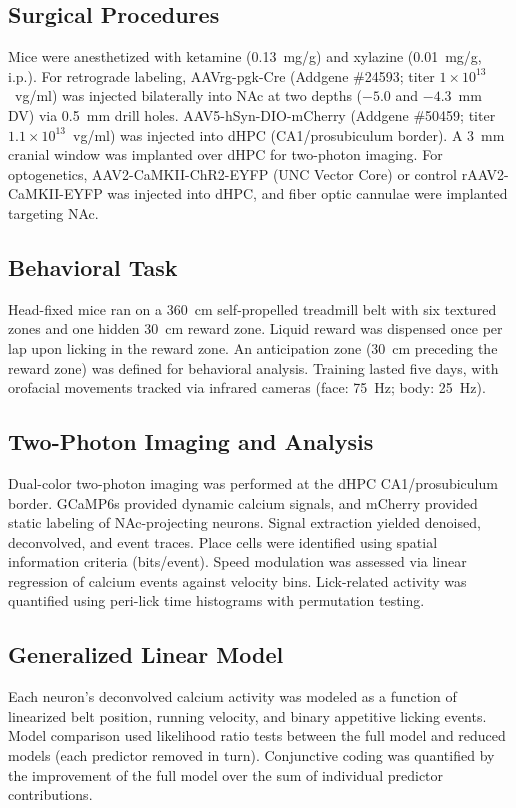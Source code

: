 \documentclass[11pt]{article}
\begin{document}
\subsection{Surgical Procedures}
Mice were anesthetized with ketamine (0.13~mg/g) and xylazine (0.01~mg/g, i.p.). For retrograde labeling, AAVrg-pgk-Cre (Addgene \#24593; titer $1 \times 10^{13}$~vg/ml) was injected bilaterally into NAc at two depths ($-5.0$ and $-4.3$~mm DV) via 0.5~mm drill holes. AAV5-hSyn-DIO-mCherry (Addgene \#50459; titer $1.1 \times 10^{13}$~vg/ml) was injected into dHPC (CA1/prosubiculum border). A 3~mm cranial window was implanted over dHPC for two-photon imaging. For optogenetics, AAV2-CaMKII-ChR2-EYFP (UNC Vector Core) or control rAAV2-CaMKII-EYFP was injected into dHPC, and fiber optic cannulae were implanted targeting NAc.

\subsection{Behavioral Task}
Head-fixed mice ran on a 360~cm self-propelled treadmill belt with six textured zones and one hidden 30~cm reward zone. Liquid reward was dispensed once per lap upon licking in the reward zone. An anticipation zone (30~cm preceding the reward zone) was defined for behavioral analysis. Training lasted five days, with orofacial movements tracked via infrared cameras (face: 75~Hz; body: 25~Hz).

\subsection{Two-Photon Imaging and Analysis}
Dual-color two-photon imaging was performed at the dHPC CA1/prosubiculum border. GCaMP6s provided dynamic calcium signals, and mCherry provided static labeling of NAc-projecting neurons. Signal extraction yielded denoised, deconvolved, and event traces. Place cells were identified using spatial information criteria (bits/event). Speed modulation was assessed via linear regression of calcium events against velocity bins. Lick-related activity was quantified using peri-lick time histograms with permutation testing.

\subsection{Generalized Linear Model}
Each neuron's deconvolved calcium activity was modeled as a function of linearized belt position, running velocity, and binary appetitive licking events. Model comparison used likelihood ratio tests between the full model and reduced models (each predictor removed in turn). Conjunctive coding was quantified by the improvement of the full model over the sum of individual predictor contributions.
\end{document}
